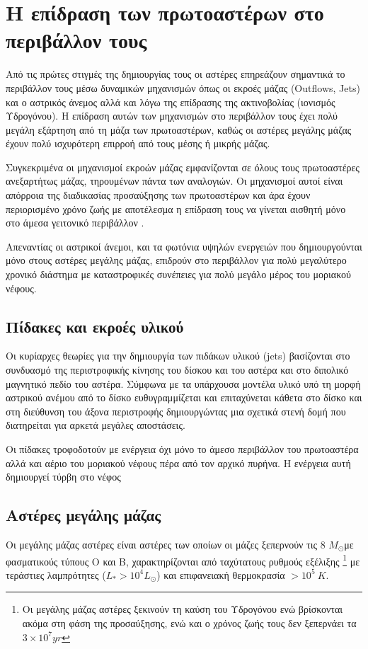 \documentclass[a4paper,12pt]{memoir}
\newcommand{\sm}{$M_{\odot}$}
\begin{document}
\section{Η επίδραση των πρωτοαστέρων στο περιβάλλον τους}

Από τις πρώτες στιγμές της δημιουργίας τους οι αστέρες επηρεάζουν σημαντικά το περιβάλλον τους μέσω δυναμικών μηχανισμών όπως οι εκροές μάζας (Outflows, Jets) και ο αστρικός άνεμος αλλά και λόγω της επίδρασης της ακτινοβολίας (ιονισμός Υδρογόνου). Η επίδραση αυτών των μηχανισμών στο περιβάλλον τους έχει πολύ μεγάλη εξάρτηση από τη μάζα των πρωτοαστέρων, καθώς οι αστέρες μεγάλης μάζας έχουν πολύ ισχυρότερη επιρροή από τους μέσης ή μικρής μάζας.

Συγκεκριμένα οι μηχανισμοί εκροών μάζας εμφανίζονται σε όλους τους πρωτοαστέρες ανεξαρτήτως μάζας, τηρουμένων πάντα των αναλογιών. Οι μηχανισμοί αυτοί είναι απόρροια της διαδικασίας προσαύξησης των πρωτοαστέρων και άρα έχουν περιορισμένο χρόνο ζωής με αποτέλεσμα η επίδραση τους να γίνεται αισθητή μόνο στο άμεσα γειτονικό περιβάλλον . 

Απεναντίας οι αστρικοί άνεμοι, και τα φωτόνια υψηλών ενεργειών που δημιουργούνται μόνο στους αστέρες μεγάλης μάζας, επιδρούν στο περιβάλλον για πολύ μεγαλύτερο χρονικό διάστημα με καταστροφικές συνέπειες για πολύ μεγάλο μέρος του μοριακού νέφους.


\subsection{Πίδακες και εκροές υλικού}
Οι κυρίαρχες θεωρίες για την δημιουργία των πιδάκων υλικού (jets) βασίζονται στο συνδυασμό της περιστροφικής κίνησης του δίσκου και του αστέρα και στο διπολικό μαγνητικό πεδίο του αστέρα. 
Σύμφωνα με τα υπάρχουσα μοντέλα υλικό υπό τη μορφή αστρικού ανέμου από το δίσκο ευθυγραμμίζεται και επιταχύνεται κάθετα στο δίσκο και στη διεύθυνση του άξονα περιστροφής δημιουργώντας μια σχετικά στενή δομή που διατηρείται για αρκετά μεγάλες αποστάσεις.

Οι πίδακες τροφοδοτούν με ενέργεια όχι μόνο το άμεσο περιβάλλον του πρωτοαστέρα αλλά και αέριο του μοριακού νέφους πέρα από τον αρχικό πυρήνα. Η ενέργεια αυτή δημιουργεί τύρβη στο νέφος


\subsection{Αστέρες μεγάλης μάζας}
Οι μεγάλης μάζας αστέρες είναι αστέρες των οποίων οι μάζες ξεπερνούν τις 8 \sm με φασματικούς τύπους O και B, χαρακτηρίζονται από ταχύτατους ρυθμούς εξέλιξης \footnote{Οι μεγάλης μάζας αστέρες ξεκινούν τη καύση του Υδρογόνου ενώ βρίσκονται ακόμα στη φάση της προσαύξησης, ενώ και ο χρόνος ζωής τους δεν ξεπερνάει τα $3 \times 10 ^7 yr$} με τεράστιες λαμπρότητες ($L_* > 10^4 L _ \odot$) και επιφανειακή θερμοκρασία $>10 ^5 \ K$.
\end{document}

